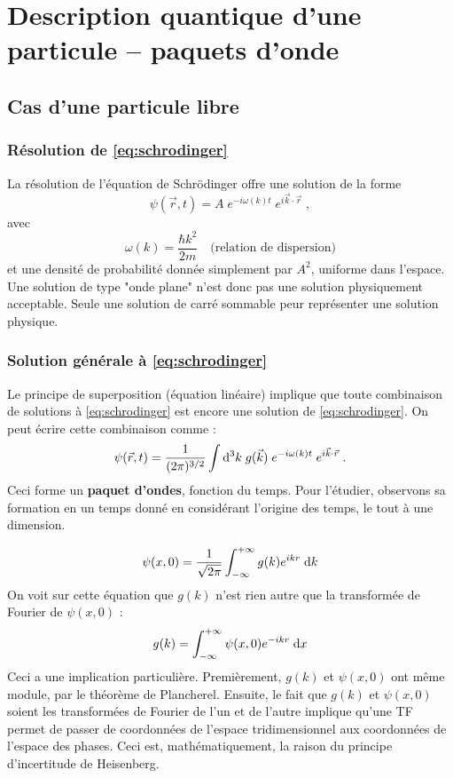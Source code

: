\documentclass[12pt, a4paper]{book}
\begin{document}

\section{Description quantique d'une particule -- paquets d'onde}
\subsection{Cas d'une particule libre}
\subsubsection{Résolution de \eqref{eq:schrodinger}}
La résolution de l'équation de Schrödinger offre une solution de la forme 
\begin{equation}\label{eq:solution_schrod}
\psi(\vec r, t) = A \; e^{-i\omega(k) t} \; e ^{i \vec k \cdot \vec r} \; ,
\end{equation}
avec 
\begin{equation}\label{eq:relation_dispersion}
\omega(k) = \dfrac{\hbar k^2}{2m} \quad \text{(relation de dispersion)}
\end{equation}
et une densité de probabilité donnée simplement par $A^2$, uniforme dans l'espace. Une solution de type "onde plane" n'est donc pas une solution physiquement acceptable. Seule une solution de carré sommable peur représenter une solution physique.
\subsubsection{Solution générale à \eqref{eq:schrodinger}}
Le principe de superposition (équation linéaire) implique que toute combinaison de solutions à \eqref{eq:schrodinger} est encore une solution de \eqref{eq:schrodinger}. On peut écrire cette combinaison comme :
\begin{equation} \label{eq:schrod_sol_gen}
\psi(\vec r, t) = \dfrac{1}{(2\pi)^{3/2}} \int \mathrm{d} ^3 k \; g(\vec k) \; e^{-i\omega(k) t} \; e^{i\vec k \cdot \vec r} \; .
\end{equation}
Ceci forme un \textbf{paquet d'ondes}, fonction du temps. Pour l'étudier, observons sa formation en un temps donné en considérant l'origine des temps, le tout à une dimension.

$$\psi(x,0) = \dfrac{1}{\sqrt{2\pi}} \int_{-\infty} ^{+\infty} g(k) e^{ikr} \; \mathrm{d} k $$
On voit sur cette équation que $g(k)$ n'est rien autre que la transformée de Fourier de $\psi(x,0)$ :
$$g(k) = \int_{-\infty} ^{+\infty} \psi(x,0) e^{-ikr} \; \mathrm{d} x $$
Ceci a une implication particulière. Premièrement, $g(k)$ et $\psi(x,0)$ ont même module, par le théorème de Plancherel. Ensuite, le fait que $g(k)$ et $\psi(x,0)$ soient les transformées de Fourier de l'un et de l'autre implique qu'une TF permet de passer de coordonnées de l'espace tridimensionnel aux coordonnées de l'espace des phases. Ceci est, mathématiquement, la raison du principe d'incertitude de Heisenberg.
\end{document}
